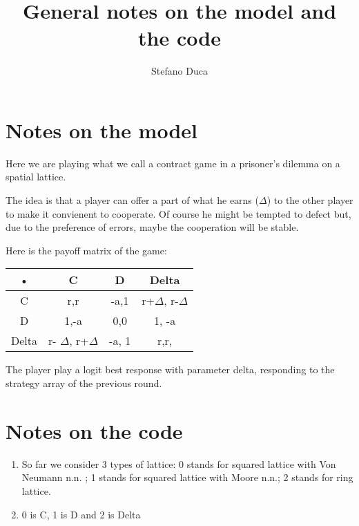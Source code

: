 \documentclass{article}
\author{Stefano Duca}
\title{General notes on the model and the code}
\begin{document}
\maketitle

\section{Notes on the model}
Here we are playing what we call a contract game in a prisoner's dilemma on a spatial lattice.

The idea is that a player can offer a part of what he earns ($\Delta$) to the other player to make it convienent to cooperate. Of course he might be tempted to defect but, due to the preference of errors, maybe the cooperation will be stable.

Here is the payoff matrix of the game:

\begin{tabular}{|c|c|c|c|}
\hline 
• & C & D & Delta \\ 
\hline 
C & r,r & -a,1 & r+$\Delta$, r-$\Delta$ \\ 
\hline 
D & 1,-a & 0,0 & 1, -a \\ 
\hline 
Delta & r- $\Delta$, r+$\Delta$ & -a, 1 & r,r, \\ 
\hline 
\end{tabular} 

The player play a logit best response with parameter delta, responding to the strategy array of the previous round.

\section{Notes on the code}
\begin{enumerate}
\item  So far we consider 3 types of lattice:
0 stands for squared lattice with Von Neumann n.n. ;
1 stands for squared lattice with Moore n.n.;
2 stands for ring lattice.

\item 0 is C, 1 is D and 2 is Delta
\end{enumerate}
\end{document}
